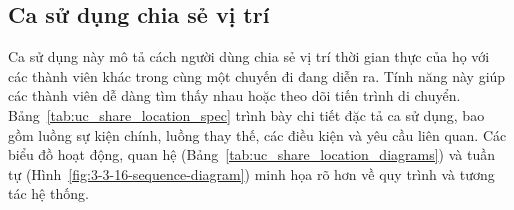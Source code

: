 \subsection{Ca sử dụng chia sẻ vị trí}
\noindent Ca sử dụng này mô tả cách người dùng chia sẻ vị trí thời gian thực của họ với các thành viên khác trong cùng một chuyến đi đang diễn ra. Tính năng này giúp các thành viên dễ dàng tìm thấy nhau hoặc theo dõi tiến trình di chuyển. Bảng~\ref{tab:uc_share_location_spec} trình bày chi tiết đặc tả ca sử dụng, bao gồm luồng sự kiện chính, luồng thay thế, các điều kiện và yêu cầu liên quan. Các biểu đồ hoạt động, quan hệ (Bảng~\ref{tab:uc_share_location_diagrams}) và tuần tự (Hình~\ref{fig:3-3-16-sequence-diagram}) minh họa rõ hơn về quy trình và tương tác hệ thống.


